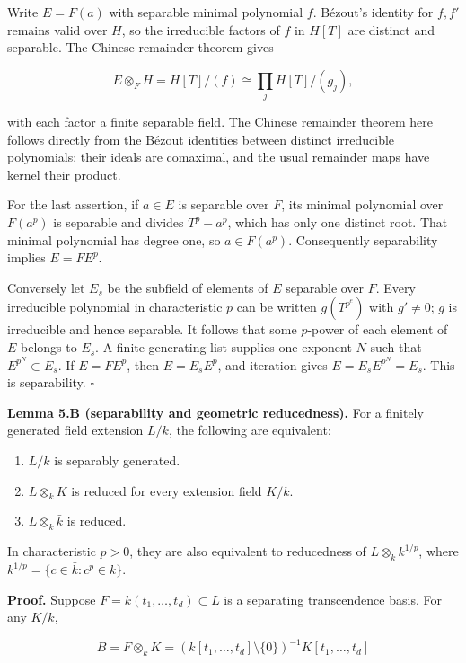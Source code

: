 \documentclass[
]{article}
\providecommand{\tightlist}{%
  \setlength{\itemsep}{0pt}\setlength{\parskip}{0pt}}
\begin{document}
Write \(E=F(a)\) with separable minimal polynomial \(f\). Bézout's
identity for \(f,f'\) remains valid over \(H\), so the irreducible
factors of \(f\) in \(H[T]\) are distinct and separable. The Chinese
remainder theorem gives

\[
E\otimes_F H=H[T]/(f)\cong\prod_j H[T]/(g_j),
\]

with each factor a finite separable field. The Chinese remainder theorem
here follows directly from the Bézout identities between distinct
irreducible polynomials: their ideals are comaximal, and the usual
remainder maps have kernel their product.

For the last assertion, if \(a\in E\) is separable over \(F\), its
minimal polynomial over \(F(a^p)\) is separable and divides \(T^p-a^p\),
which has only one distinct root. That minimal polynomial has degree
one, so \(a\in F(a^p)\). Consequently separability implies \(E=FE^p\).

Conversely let \(E_s\) be the subfield of elements of \(E\) separable
over \(F\). Every irreducible polynomial in characteristic \(p\) can be
written \(g(T^{p^e})\) with \(g'\ne0\); \(g\) is irreducible and hence
separable. It follows that some \(p\)-power of each element of \(E\)
belongs to \(E_s\). A finite generating list supplies one exponent \(N\)
such that \(E^{p^N}\subset E_s\). If \(E=FE^p\), then \(E=E_sE^p\), and
iteration gives \(E=E_sE^{p^N}=E_s\). This is separability. \(\square\)

\textbf{Lemma 5.B (separability and geometric reducedness).} For a
finitely generated field extension \(L/k\), the following are
equivalent:

\begin{enumerate}
\def\labelenumi{\arabic{enumi}.}
\tightlist
\item
  \(L/k\) is separably generated.
\item
  \(L\otimes_k K\) is reduced for every extension field \(K/k\).
\item
  \(L\otimes_k\bar k\) is reduced.
\end{enumerate}

In characteristic \(p>0\), they are also equivalent to reducedness of
\(L\otimes_k k^{1/p}\), where \(k^{1/p}=\{c\in\bar k:c^p\in k\}\).

\textbf{Proof.} Suppose \(F=k(t_1,\ldots,t_d)\subset L\) is a separating
transcendence basis. For any \(K/k\),

\[
B=F\otimes_k K=(k[t_1,\ldots,t_d]\setminus\{0\})^{-1}K[t_1,\ldots,t_d]
\]
\end{document}
